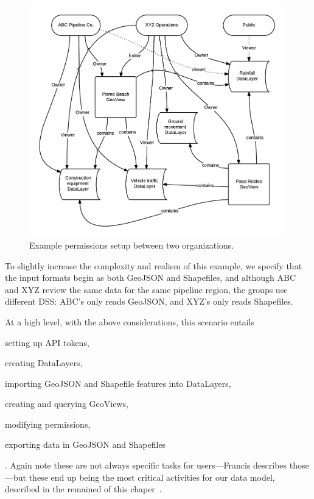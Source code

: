 \begin{figure}
    \centering
    \includegraphics[width=0.99\textwidth]{figures/permissions.png}
    \caption{Example permissions setup between two organizations.}
    \label{fig:permissions}
\end{figure}

To slightly increase the complexity and realism of this example, we specify that the input formats begin as both GeoJSON and Shapefiles, and although ABC and XYZ review the same data for the same pipeline region, the groups use different DSS: ABC's only reads GeoJSON, and XYZ's only reads Shapefiles.

At a high level, with the above considerations, this scenario entails
\begin{enumerate*}[label=\itshape\alph*\upshape)]
\item setting up API tokens,
\item creating DataLayers,
\item importing GeoJSON and Shapefile features into DataLayers,
\item creating and querying GeoViews,
\item modifying permissions,
\item exporting data in GeoJSON and Shapefiles
\end{enumerate*}. Again note these are not always specific tasks for users---Francis describes those---but these end up being the most critical activities for our data model, described in the remained of this chaper~\cite{Francis}.

